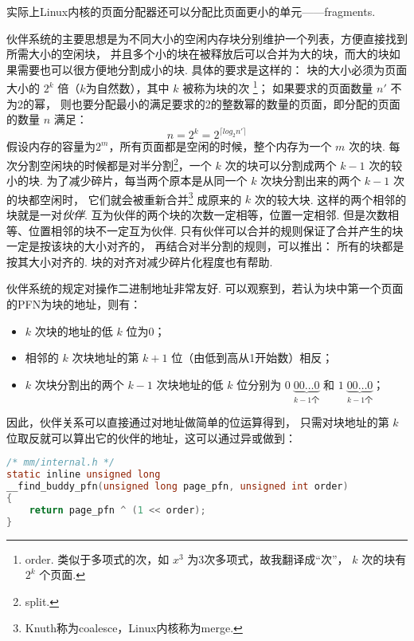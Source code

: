 \begin{notebox}
	实际上Linux内核的页面分配器还可以分配比页面更小的单元——fragments.
\end{notebox}

伙伴系统的主要思想是为不同大小的空闲内存块分别维护一个列表，方便直接找到所需大小的空闲块，
并且多个小的块在被释放后可以合并为大的块，而大的块如果需要也可以很方便地分割成小的块.
具体的要求是这样的：
块的大小必须为页面大小的 $2^k$ 倍（$k$为自然数），其中 $k$ 被称为块的次%
\footnote{order. 类似于多项式的次，如 $x^3$ 为3次多项式，故我翻译成“次”，
	$k$ 次的块有 $2^k$ 个页面.}；
如果要求的页面数量 $n'$ 不为2的幂，
则也要分配最小的满足要求的2的整数幂的数量的页面，即分配的页面的数量 $n$ 满足：
\begin{equation*}
	n = 2^k = 2^{\lceil log_{2}{n'}\rceil}
\end{equation*}
假设内存的容量为$2^m$，所有页面都是空闲的时候，整个内存为一个 $m$ 次的块.
每次分割空闲块的时候都是对半分割\footnote{split.}，一个 $k$ 次的块可以分割成两个 $k-1$ 次的较小的块.
为了减少碎片，每当两个原本是从同一个 $k$ 次块分割出来的两个 $k-1$ 次的块都空闲时，
它们就会被重新合并\footnote{Knuth称为coalesce，Linux内核称为merge.}%
成原来的 $k$ 次的较大块.
这样的两个相邻的块就是一对\emph{伙伴}.
互为伙伴的两个块的次数一定相等，位置一定相邻.
但是次数相等、位置相邻的块不一定互为伙伴.
只有伙伴可以合并的规则保证了合并产生的块一定是按该块的大小对齐的，
再结合对半分割的规则，可以推出：
所有的块都是按其大小对齐的.
块的对齐对减少碎片化程度也有帮助.

伙伴系统的规定对操作二进制地址非常友好.\cite{taocp1}
可以观察到，若认为块中第一个页面的PFN为块的地址，则有：
\begin{itemize}
	\item $k$ 次块的地址的低 $k$ 位为0；
	\item 相邻的 $k$ 次块地址的第 $k+1$ 位（由低到高从1开始数）相反；
	\item $k$ 次块分割出的两个 $k-1$ 次块地址的低 $k$ 位分别为
	      $0\;{\underbrace{00\dots 0}_{k-1\text{个}}}$ 和
	      $1\;{\underbrace{00\dots 0}_{k-1\text{个}}}$；
\end{itemize}
因此，伙伴关系可以直接通过对地址做简单的位运算得到，
只需对块地址的第 $k$ 位取反就可以算出它的伙伴的地址，这可以通过异或做到：
\begin{lstlisting}[language=C,label={lst: find_buddy_pfn},caption={计算伙伴的PFN}]
/* mm/internal.h */
static inline unsigned long
__find_buddy_pfn(unsigned long page_pfn, unsigned int order)
{
	return page_pfn ^ (1 << order);
}
\end{lstlisting}

